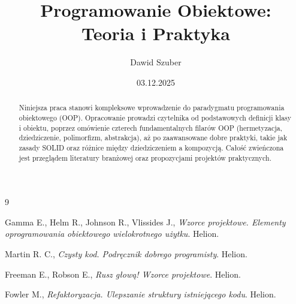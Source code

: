 \documentclass[12pt, a4paper]{report}
\title{\textbf{Programowanie Obiektowe:\\Teoria i Praktyka}}
\author{Dawid Szuber}
\date{03.12.2025}
\begin{document}
\maketitle

\begin{abstract}
\noindent
Niniejsza praca stanowi kompleksowe wprowadzenie do paradygmatu programowania obiektowego (OOP). Opracowanie prowadzi czytelnika od podstawowych definicji klasy i obiektu, poprzez omówienie czterech fundamentalnych filarów OOP (hermetyzacja, dziedziczenie, polimorfizm, abstrakcja), aż po zaawansowane dobre praktyki, takie jak zasady SOLID oraz różnice między dziedziczeniem a kompozycją. Całość zwieńczona jest przeglądem literatury branżowej oraz propozycjami projektów praktycznych.
\end{abstract}

\tableofcontents






\begin{thebibliography}{9}

Gamma E., Helm R., Johnson R., Vlissides J.,
\textit{Wzorce projektowe. Elementy oprogramowania obiektowego wielokrotnego użytku}.
Helion.

Martin R. C.,
\textit{Czysty kod. Podręcznik dobrego programisty}.
Helion.

Freeman E., Robson E.,
\textit{Rusz głową! Wzorce projektowe}.
Helion.

Fowler M.,
\textit{Refaktoryzacja. Ulepszanie struktury istniejącego kodu}.
Helion.

\end{thebibliography}
\end{document}
